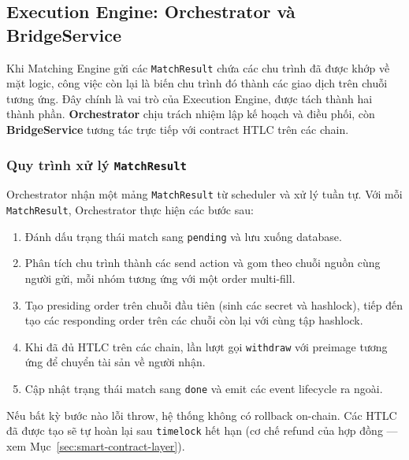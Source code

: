 
\subsection{Execution Engine: Orchestrator và BridgeService}
\label{sec:execution-engine}

Khi Matching Engine gửi các \texttt{MatchResult} chứa các chu trình đã được khớp về mặt logic, 
công việc còn lại là biến chu trình đó thành các giao dịch trên chuỗi
tương ứng. Đây chính là vai trò của Execution Engine, được tách thành hai thành phần. 
\textbf{Orchestrator} chịu trách nhiệm lập kế hoạch và điều phối, 
còn \textbf{BridgeService} tương tác trực tiếp với contract HTLC trên các chain.

\subsubsection{Quy trình xử lý \texttt{MatchResult}}

Orchestrator nhận một mảng \texttt{MatchResult} từ scheduler và 
xử lý tuần tự. 
Với mỗi \texttt{MatchResult}, Orchestrator thực hiện các bước sau:

\begin{enumerate}
  \item Đánh dấu trạng thái match sang \texttt{pending} và lưu xuống database.
  \item Phân tích chu trình thành các send action và gom theo chuỗi nguồn cùng người gửi, mỗi nhóm tương ứng với một order multi-fill.
  \item Tạo presiding order trên chuỗi đầu tiên (sinh các secret và hashlock), tiếp đến tạo các responding order trên các chuỗi còn lại với cùng tập hashlock.
  \item Khi đã đủ HTLC trên các chain, lần lượt gọi \texttt{withdraw} với preimage tương ứng để chuyển tài sản về người nhận.
  \item Cập nhật trạng thái match sang \texttt{done} và emit các event lifecycle ra ngoài.
\end{enumerate}

Nếu bất kỳ bước nào lỗi throw, hệ thống không có rollback on-chain. Các HTLC đã được tạo sẽ tự hoàn lại sau 
\texttt{timelock} hết hạn (cơ chế refund của hợp đồng — 
xem Mục~\ref{sec:smart-contract-layer}).

